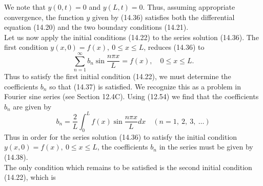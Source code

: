 \documentclass[11pt,a4paper, twoside]{report}
\begin{document}
	We note that $y(0, t) = 0$ and $y(L, t) = 0$. Thus, assuming appropriate convergence, the function $y$ given by (14.36) satisfies both the differential equation (14.20) and the two boundary conditions (14.21).\\
	Let us now apply the initial conditions (14.22) to the series solution (14.36). The first condition $y(x, 0) = f(x),\ 0 \leq x \leq L$, reduces (14.36) to
	\begin{equation}\tag{14.37}\label{14.37}
		\sum_{n=1}^\infty b_n \sin \frac{n \pi x}{L} = f(x),\quad 0 \leq x \leq L.
	\end{equation}
	Thus to satisfy the first initial condition (14.22), we must determine the coefficients $b_n$ so that (14.37) is satisfied. We recognize this as a problem in Fourier sine series (see Section 12.4C). Using (12.54) we find that the coefficients $b_n$ are given by
	\begin{equation}\tag{14.38}\label{14.38}
		b_n = \frac{2}{L}\int_0^L f(x) \sin\frac{n\pi x}{L}dx\quad (n = 1,\ 2,\ 3,\ \ldots)
	\end{equation}
	Thus in order for the series solution (14.36) to satisfy the initial condition $y(x, 0) = f(x),\ 0\leq x \leq L$, the coefficients $b_n$ in the series must be given by (14.38).\\
	The only condition which remains to be satisfied is the second initial condition (14.22), which is
\end{document}
